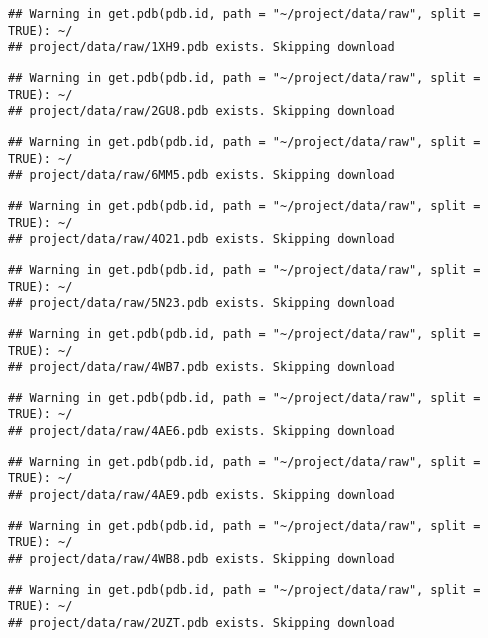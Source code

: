 \documentclass[
]{article}
\begin{document}
\begin{verbatim}
## Warning in get.pdb(pdb.id, path = "~/project/data/raw", split = TRUE): ~/
## project/data/raw/1XH9.pdb exists. Skipping download
\end{verbatim}

\begin{verbatim}
## Warning in get.pdb(pdb.id, path = "~/project/data/raw", split = TRUE): ~/
## project/data/raw/2GU8.pdb exists. Skipping download
\end{verbatim}

\begin{verbatim}
## Warning in get.pdb(pdb.id, path = "~/project/data/raw", split = TRUE): ~/
## project/data/raw/6MM5.pdb exists. Skipping download
\end{verbatim}

\begin{verbatim}
## Warning in get.pdb(pdb.id, path = "~/project/data/raw", split = TRUE): ~/
## project/data/raw/4O21.pdb exists. Skipping download
\end{verbatim}

\begin{verbatim}
## Warning in get.pdb(pdb.id, path = "~/project/data/raw", split = TRUE): ~/
## project/data/raw/5N23.pdb exists. Skipping download
\end{verbatim}

\begin{verbatim}
## Warning in get.pdb(pdb.id, path = "~/project/data/raw", split = TRUE): ~/
## project/data/raw/4WB7.pdb exists. Skipping download
\end{verbatim}

\begin{verbatim}
## Warning in get.pdb(pdb.id, path = "~/project/data/raw", split = TRUE): ~/
## project/data/raw/4AE6.pdb exists. Skipping download
\end{verbatim}

\begin{verbatim}
## Warning in get.pdb(pdb.id, path = "~/project/data/raw", split = TRUE): ~/
## project/data/raw/4AE9.pdb exists. Skipping download
\end{verbatim}

\begin{verbatim}
## Warning in get.pdb(pdb.id, path = "~/project/data/raw", split = TRUE): ~/
## project/data/raw/4WB8.pdb exists. Skipping download
\end{verbatim}

\begin{verbatim}
## Warning in get.pdb(pdb.id, path = "~/project/data/raw", split = TRUE): ~/
## project/data/raw/2UZT.pdb exists. Skipping download
\end{verbatim}
\end{document}
